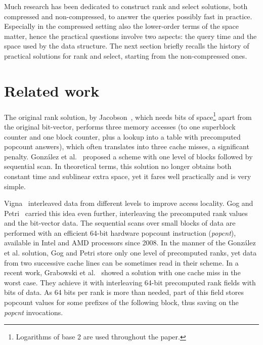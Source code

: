 \documentclass{llncs}
\begin{document}
Much research has been dedicated to construct rank and select solutions, 
both compressed and non-compressed, to answer the queries possibly fast 
in practice.
Especially in the compressed setting also the lower-order terms 
of the space matter, 
hence the practical questions involve two aspects: the query time and the 
space used by the data structure.
The next section briefly recalls
the history of practical solutions for rank 
and select, starting from the non-compressed ones.


\section{Related work}
\noindent 
The original rank solution, by Jacobson~\cite{Jac1989}, 
which needs  bits of space\footnote{Logarithms 
of base 2 are used throughout the paper.}
apart from the original bit-vector,
performs three memory accesses (to one superblock counter 
and one block counter, plus a lookup into a table 
with precomputed popcount answers), which often translates into 
three cache misses, a significant penalty.
Gonz{\'a}lez et al.~\cite{GGMN05} proposed a scheme with 
one level of blocks followed by sequential scan.
In theoretical terms, this solution no longer obtains both constant time 
and sublinear extra space, yet it fares well practically and is very simple.

Vigna~\cite{V08} interleaved data from different levels to improve access locality.
Gog and Petri~\cite{GP13} carried this idea even further, 
interleaving the precomputed rank values and the bit-vector data. 
The sequential scans over small blocks of data are performed with 
an efficient 64-bit hardware popcount instruction ({\em popcnt}),
available in Intel and AMD processors since 2008.
In the manner of the Gonz{\'a}lez et al. solution, 
Gog and Petri store only one level of precomputed ranks, yet 
data from two successive cache lines can be sometimes read in their scheme.
In a recent work, Grabowski et al.~\cite{GrabowskiRD2015} showed a solution 
with one cache miss in the worst case.
They achieve it with interleaving 64-bit precomputed rank fields 
with  bits of data.
As 64 bits per rank is more than needed, part of this field stores 
popcount values for some prefixes of the following block, thus 
saving on the {\em popcnt} invocations.
\end{document}
